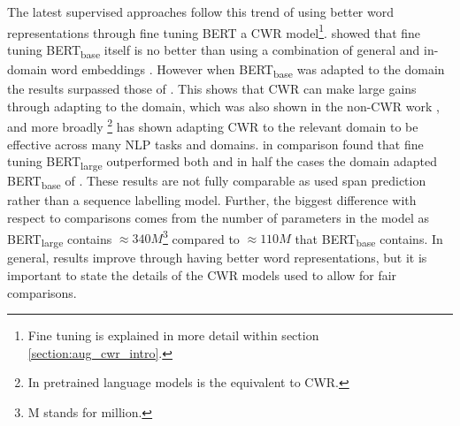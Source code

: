 The latest supervised approaches follow this trend of using better word representations through fine tuning BERT \citep{devlin-etal-2019-bert} a CWR model\footnote{Fine tuning is explained in more detail within section \ref{section:aug_cwr_intro}.}. \citet{xu-etal-2019-bert} showed that fine tuning BERT\textsubscript{base} itself is no better than using a combination of general and in-domain word embeddings \citep{xu-etal-2018-double}. However when BERT\textsubscript{base} was adapted to the domain the results surpassed those of \citet{xu-etal-2018-double}. This shows that CWR can make large gains through adapting to the domain, which was also shown in the non-CWR work \citep{liu-etal-2015-fine, jebbara2016aspect}, and more broadly \citet{gururangan2020don}\footnote{In \citet{gururangan2020don} pretrained language models is the equivalent to CWR.} has shown adapting CWR to the relevant domain to be effective across many NLP tasks and domains. \citet{hu-etal-2019-open} in comparison found that fine tuning BERT\textsubscript{large} outperformed both \citet{xu-etal-2018-double} and in half the cases the domain adapted BERT\textsubscript{base} of \citet{xu-etal-2019-bert}. These results are not fully comparable as \citet{hu-etal-2019-open} used span prediction rather than a sequence labelling model. Further, the biggest difference with respect to comparisons comes from the number of parameters in the model as BERT\textsubscript{large} contains $\approx 340M$\footnote{M stands for million.} compared to $\approx 110M$ that BERT\textsubscript{base} contains. In general, results improve through having better word representations, but it is important to state the details of the CWR models used to allow for fair comparisons.


